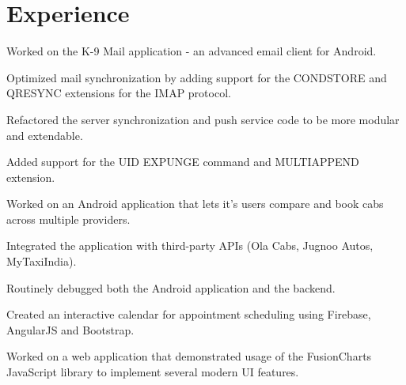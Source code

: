 \documentclass[]{deedy-resume-openfont}
\begin{document}
%
%
\begin{minipage}[t]{0.48\textwidth} 


\section{Experience}

\vspace{\topsep} %
\begin{tightemize}
\item Worked on the K-9 Mail application - an advanced email client for Android.
\item Optimized mail synchronization by adding support for the CONDSTORE and QRESYNC extensions for the IMAP protocol.
\item Refactored the server synchronization and push service code to be more modular and extendable.
\item Added support for the UID EXPUNGE command and MULTIAPPEND extension.
\end{tightemize}
\sectionsep

\begin{tightemize}
\item Worked on an Android application that lets it's users compare and book cabs across multiple providers.
\item Integrated the application with third-party APIs (Ola Cabs, Jugnoo Autos, MyTaxiIndia).
\item Routinely debugged both the Android application and the backend.
\end{tightemize}
\sectionsep

\begin{tightemize}
\item Created an interactive calendar for appointment scheduling using Firebase, AngularJS and Bootstrap.
\end{tightemize}
\sectionsep

\begin{tightemize}
\item Worked on a web application that demonstrated usage of the FusionCharts JavaScript library to implement several modern UI features.
\end{tightemize}
\sectionsep


\end{minipage}
\end{document}
